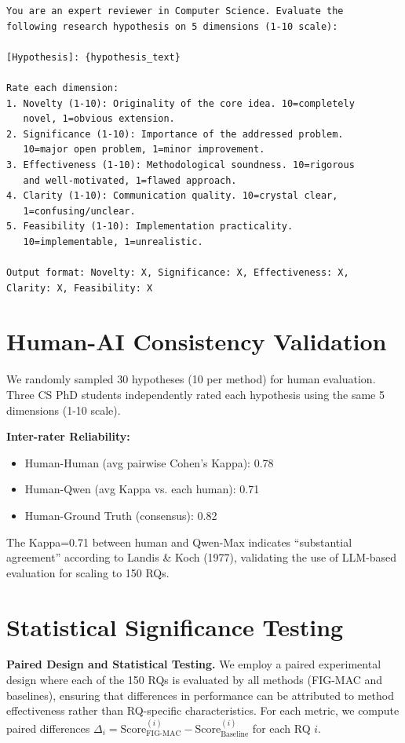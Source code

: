 \documentclass[runningheads]{llncs}
\begin{document}
\begin{verbatim}
You are an expert reviewer in Computer Science. Evaluate the 
following research hypothesis on 5 dimensions (1-10 scale):

[Hypothesis]: {hypothesis_text}

Rate each dimension:
1. Novelty (1-10): Originality of the core idea. 10=completely 
   novel, 1=obvious extension.
2. Significance (1-10): Importance of the addressed problem. 
   10=major open problem, 1=minor improvement.
3. Effectiveness (1-10): Methodological soundness. 10=rigorous 
   and well-motivated, 1=flawed approach.
4. Clarity (1-10): Communication quality. 10=crystal clear, 
   1=confusing/unclear.
5. Feasibility (1-10): Implementation practicality. 
   10=implementable, 1=unrealistic.

Output format: Novelty: X, Significance: X, Effectiveness: X, 
Clarity: X, Feasibility: X
\end{verbatim}

\section{Human-AI Consistency Validation}
\label{app:human_eval}

We randomly sampled 30 hypotheses (10 per method) for human evaluation. Three CS PhD students independently rated each hypothesis using the same 5 dimensions (1-10 scale).

\textbf{Inter-rater Reliability:}
\begin{itemize}[leftmargin=*]
    \item Human-Human (avg pairwise Cohen's Kappa): 0.78
    \item Human-Qwen (avg Kappa vs. each human): 0.71
    \item Human-Ground Truth (consensus): 0.82
\end{itemize}

The Kappa=0.71 between human and Qwen-Max indicates ``substantial agreement'' according to Landis \& Koch (1977), validating the use of LLM-based evaluation for scaling to 150 RQs.

\section{Statistical Significance Testing}
\label{app:statistical_testing}

\textbf{Paired Design and Statistical Testing.} We employ a paired experimental design where each of the 150 RQs is evaluated by all methods (FIG-MAC and baselines), ensuring that differences in performance can be attributed to method effectiveness rather than RQ-specific characteristics. For each metric, we compute paired differences $\Delta_i = \text{Score}_{\text{FIG-MAC}}^{(i)} - \text{Score}_{\text{Baseline}}^{(i)}$ for each RQ $i$.
\end{document}
